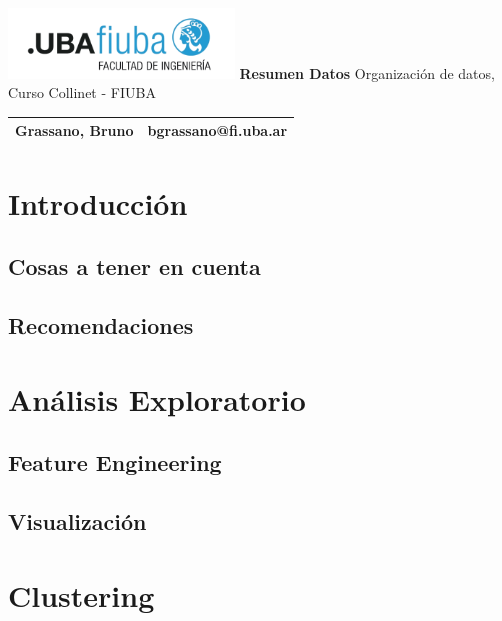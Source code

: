 \documentclass[titlepage,a4paper]{article}
\begin{document}
\begin{titlepage} %
	\hfill\includegraphics[width=6cm]{imagenesResumen/logofiuba.jpg}
    \centering
    \vfill
    \Huge \textbf{Resumen Datos}
    \vskip2cm
    \Large Organización de datos, Curso Collinet - FIUBA\\
    \vfill
    \begin{tabular}{ | l | l | }
      \hline
       Grassano, Bruno &  bgrassano@fi.uba.ar \\ \hline
  	\end{tabular}
    \vfill
    \vfill
\end{titlepage}

\tableofcontents %
\newpage

\section{Introducción}\label{sec:intro}


\subsection{Cosas a tener en cuenta}


\subsection{Recomendaciones}


\section{Análisis Exploratorio}

\subsection{Feature Engineering}


\subsection{Visualización}



\section{Clustering}
\end{document}
